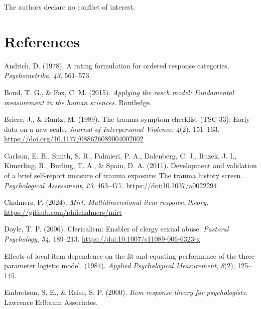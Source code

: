 \documentclass[
  letterpaper,
]{article}
\newlength{\cslhangindent}
\newenvironment{CSLReferences}[2] %
 {\begin{list}{}{%
  \setlength{\itemindent}{0pt}
  \setlength{\leftmargin}{0pt}
  \setlength{\parsep}{0pt}
  \ifodd #1
   \setlength{\leftmargin}{\cslhangindent}
   \setlength{\itemindent}{-1\cslhangindent}
  \fi
  \setlength{\itemsep}{#2\baselineskip}}}
 {\end{list}}
\begin{document}

The authors declare no conflict of interest.


\chapter*{References}\label{references}


\label{refs}
\begin{CSLReferences}{1}{0}
Andrich, D. (1978). A rating formulation for ordered response
categories. \emph{Psychometrika}, \emph{43}, 561--573.

Bond, T. G., \& Fox, C. M. (2015). \emph{Applying the rasch model:
Fundamental measurement in the human sciences}. Routledge.

Briere, J., \& Runtz, M. (1989). The trauma symptom checklist (TSC-33):
Early data on a new scale. \emph{Journal of Interpersonal Violence},
\emph{4}(2), 151--163. \url{https://doi.org/10.1177/088626089004002002}

Carlson, E. B., Smith, S. R., Palmieri, P. A., Dalenberg, C. J., Ruzek,
J. I., Kimerling, R., Burling, T. A., \& Spain, D. A. (2011).
Development and validation of a brief self-report measure of trauma
exposure: The trauma history screen. \emph{Psychological Assessment},
\emph{23}, 463--477. \url{https://doi:10.1037/a0022294}

Chalmers, P. (2024). \emph{Mirt: Multidimensional item response theory}.
\url{https://github.com/philchalmers/mirt}

Doyle, T. P. (2006). Clericalism: Enabler of clergy sexual abuse.
\emph{Pastoral Psychology}, \emph{54}, 189--213.
\url{https://doi:10.1007/s11089-006-6323-x}

Effects of local item dependence on the fit and equating performance of
the three-parameter logistic model. (1984). \emph{Applied Psychological
Measurement}, \emph{8}(2), 125--145.

Embretson, S. E., \& Reise, S. P. (2000). \emph{Item response theory for
psychologists}. Lawrence Erlbaum Associates.


\end{CSLReferences}
\end{document}
